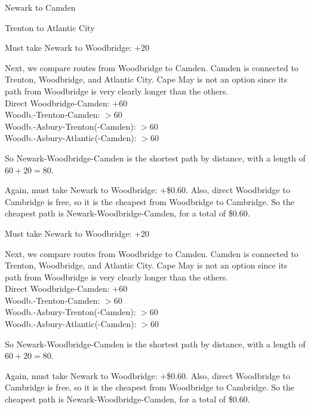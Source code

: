 \documentclass[12pt]{exam}
\begin{document}
\begin{qparts}
    \item Newark to Camden
    \item Trenton to Atlantic City
\end{qparts}

\begin{solution}
    \begin{qparts}
        \item \begin{qsubparts}
            \item Must take Newark to Woodbridge: +20 \\
            \par Next, we compare routes from Woodbridge to Camden. Camden is connected to Trenton, Woodbridge, and Atlantic City. Cape May is not an option since its path from Woodbridge is very clearly longer than the others. \\
            Direct Woodbridge-Camden: +60 \\
            Woodb.-Trenton-Camden: $>60$ \\
            Woodb.-Asbury-Trenton(-Camden): $>60$ \\
            Woodb.-Asbury-Atlantic(-Camden): $>60$ \\
            \par So Newark-Woodbridge-Camden is the shortest path by distance, with a length of $60+20 = 80$.
            \item Again, must take Newark to Woodbridge: +\$0.60. Also, direct Woodbridge to Cambridge is free, so it is the cheapest from Woodbridge to Cambridge. So the cheapest path is Newark-Woodbridge-Camden, for a total of \$0.60.
        \end{qsubparts}
        \item \begin{qsubparts}
            \item Must take Newark to Woodbridge: +20 \\
            \par Next, we compare routes from Woodbridge to Camden. Camden is connected to Trenton, Woodbridge, and Atlantic City. Cape May is not an option since its path from Woodbridge is very clearly longer than the others. \\
            Direct Woodbridge-Camden: +60 \\
            Woodb.-Trenton-Camden: $>60$ \\
            Woodb.-Asbury-Trenton(-Camden): $>60$ \\
            Woodb.-Asbury-Atlantic(-Camden): $>60$ \\
            \par So Newark-Woodbridge-Camden is the shortest path by distance, with a length of $60+20 = 80$.
            \item Again, must take Newark to Woodbridge: +\$0.60. Also, direct Woodbridge to Cambridge is free, so it is the cheapest from Woodbridge to Cambridge. So the cheapest path is Newark-Woodbridge-Camden, for a total of \$0.60.
        \end{qsubparts}
    \end{qparts}
\end{solution}
\end{document}
